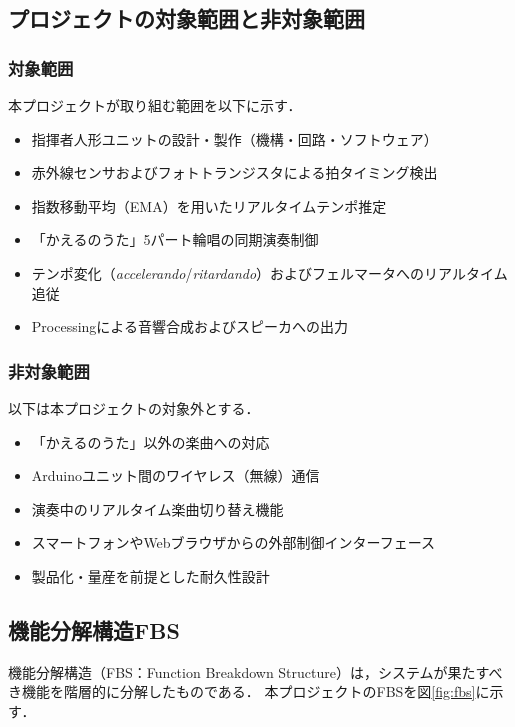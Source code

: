 \documentclass[lualatex,book,paper=a4paper,jafontsize=11.5pt,jafontscale=1.05,oneside]{jlreq}
\begin{document}
\subsection{プロジェクトの対象範囲と非対象範囲}

\subsubsection{対象範囲}
本プロジェクトが取り組む範囲を以下に示す．
\begin{itemize}
  \item 指揮者人形ユニットの設計・製作（機構・回路・ソフトウェア）
  \item 赤外線センサおよびフォトトランジスタによる拍タイミング検出
  \item 指数移動平均（EMA）を用いたリアルタイムテンポ推定
  \item 「かえるのうた」5パート輪唱の同期演奏制御
  \item テンポ変化（\textit{accelerando}/\textit{ritardando}）およびフェルマータへのリアルタイム追従
  \item Processingによる音響合成およびスピーカへの出力
\end{itemize}

\subsubsection{非対象範囲}
以下は本プロジェクトの対象外とする．
\begin{itemize}
  \item 「かえるのうた」以外の楽曲への対応
  \item Arduinoユニット間のワイヤレス（無線）通信
  \item 演奏中のリアルタイム楽曲切り替え機能
  \item スマートフォンやWebブラウザからの外部制御インターフェース
  \item 製品化・量産を前提とした耐久性設計
\end{itemize}

\subsection{機能分解構造FBS}

機能分解構造（FBS：Function Breakdown Structure）は，システムが果たすべき機能を階層的に分解したものである．
本プロジェクトのFBSを図\ref{fig:fbs}に示す．
\end{document}
